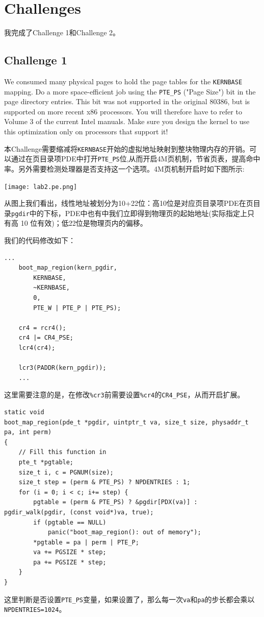 \documentclass[11pt]{article}
\begin{document}
\section{Challenges}
我完成了Challenge 1和Challenge 2。
\subsection{Challenge 1}
\begin{framed}
We consumed many physical pages to hold the page tables for the \lstinline|KERNBASE| mapping. Do a more space-efficient job using the \lstinline|PTE_PS| ("Page Size") bit in the page directory entries. This bit was not supported in the original 80386, but is supported on more recent x86 processors. You will therefore have to refer to Volume 3 of the current Intel manuals. Make sure you design the kernel to use this optimization only on processors that support it!
\end{framed}
本Challenge需要缩减将\lstinline|KERNBASE|开始的虚拟地址映射到整块物理内存的开销。可以通过在页目录项PDE中打开\lstinline|PTE_PS|位,从而开启4M页机制，节省页表，提高命中率。另外需要检测处理器是否支持这一个选项。4M页机制开启时如下图所示:

\begin{center}
\texttt{[image: lab2.pe.png]}
\end{center}

从图上我们看出，线性地址被划分为10+22位：高10位是对应页目录项PDE在页目录\lstinline|pgdir|中的下标，PDE中也有中我们立即得到物理页的起始地址(实际指定上只有高 10 位有效)；低22位是物理页内的偏移。

我们的代码修改如下：

\begin{lstlisting}[title=mem\_init()]
    ...
	boot_map_region(kern_pgdir,
		KERNBASE,
		~KERNBASE,
		0,
		PTE_W | PTE_P | PTE_PS);

	cr4 = rcr4();
	cr4 |= CR4_PSE;
	lcr4(cr4);

	lcr3(PADDR(kern_pgdir));
	...
\end{lstlisting}
这里需要注意的是，在修改\lstinline|%cr3|前需要设置\lstinline|%cr4|的\lstinline|CR4_PSE|，从而开启扩展。

\begin{lstlisting}[title=boot\_map\_region()]
static void
boot_map_region(pde_t *pgdir, uintptr_t va, size_t size, physaddr_t pa, int perm)
{
	// Fill this function in
	pte_t *pgtable;
	size_t i, c = PGNUM(size);
	size_t step = (perm & PTE_PS) ? NPDENTRIES : 1;
	for (i = 0; i < c; i+= step) {
		pgtable = (perm & PTE_PS) ? &pgdir[PDX(va)] : pgdir_walk(pgdir, (const void*)va, true);
		if (pgtable == NULL)
			panic("boot_map_region(): out of memory");
		*pgtable = pa | perm | PTE_P;
		va += PGSIZE * step;
		pa += PGSIZE * step;
	}
}
\end{lstlisting}
这里判断是否设置\lstinline|PTE_PS|变量，如果设置了，那么每一次\lstinline|va|和\lstinline|pa|的步长都会乘以\lstinline|NPDENTRIES=1024|。
\end{document}

